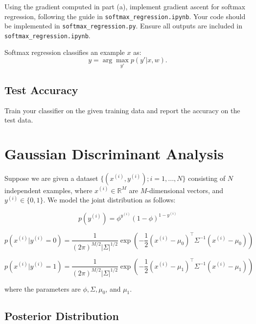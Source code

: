 \documentclass[lang=cn,11pt]{elegantbook}
\begin{document}
Using the gradient computed in part (a), implement gradient ascent for softmax regression, following the guide in \texttt{softmax\_regression.ipynb}. Your code should be implemented in \texttt{softmax\_regression.py}. Ensure all outputs are included in \texttt{softmax\_regression.ipynb}.

Softmax regression classifies an example $x$ as:
\begin{equation}
    y = \arg\max_{y'} p(y'|x,w).
\end{equation}

\subsection{Test Accuracy}

Train your classifier on the given training data and report the accuracy on the test data.



\section{Gaussian Discriminant Analysis}

Suppose we are given a dataset $\{(x^{(i)}, y^{(i)}); i = 1, ..., N\}$ consisting of $N$ independent examples, where $x^{(i)} \in \mathbb{R}^M$ are $M$-dimensional vectors, and $y^{(i)} \in \{0, 1\}$. We model the joint distribution as follows:

\begin{equation}
    p(y^{(i)}) = \phi^{y^{(i)}} (1 - \phi)^{1 - y^{(i)}}
\end{equation}

\begin{equation}
    p(x^{(i)}|y^{(i)}=0) = \frac{1}{(2\pi)^{M/2} |\Sigma|^{1/2}} \exp\left(-\frac{1}{2} (x^{(i)} - \mu_0)^\top \Sigma^{-1} (x^{(i)} - \mu_0)\right)
\end{equation}

\begin{equation}
    p(x^{(i)}|y^{(i)}=1) = \frac{1}{(2\pi)^{M/2} |\Sigma|^{1/2}} \exp\left(-\frac{1}{2} (x^{(i)} - \mu_1)^\top \Sigma^{-1} (x^{(i)} - \mu_1)\right)
\end{equation}

where the parameters are $\phi, \Sigma, \mu_0$, and $\mu_1$.

\subsection{Posterior Distribution}
\end{document}
